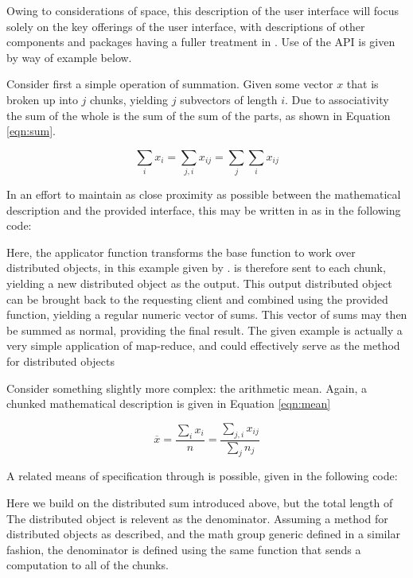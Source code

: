 Owing to considerations of space, this description of the user interface will focus solely on the key offerings of the  user interface, with descriptions of other components and packages having a fuller treatment in \cite{cairns2023}.
Use of the API is given by way of example below.

Consider first a simple operation of summation.
Given some vector $x$ that is broken up into $j$ chunks, yielding $j$ subvectors of length $i$.
Due to associativity the sum of the whole is the sum of the sum of the parts, as shown in Equation \ref{eqn:sum}.

\begin{equation}\label{eqn:sum}
    \sum_i x_i= \sum_{j,i}x_{ij} = \sum_j\sum_i x_{ij}
\end{equation}

In an effort to maintain as close proximity as possible between the mathematical description and the provided interface, this may be written in  as in the following  code:


Here, the  applicator function transforms the base  function to work over distributed objects, in this example given by .
 is therefore sent to each chunk, yielding a new distributed object as the output.
This output distributed object can be brought back to the requesting client and combined using the provided  function, yielding a regular  numeric vector of sums.
This vector of sums may then be summed as normal, providing the final result.
The given example is actually a very simple application of map-reduce, and could effectively serve as the  method for distributed objects

Consider something slightly more complex: the arithmetic mean.
Again, a chunked mathematical description is given in Equation \ref{eqn:mean}

\begin{equation}\label{eqn:mean}
    \overline{x} = \frac{\sum_{i}x_{i}}{n} = \frac{\sum_{j,i}x_{ij}}{\sum_j n_j}
\end{equation}

A related means of specification through  is possible, given in the following code:


Here we build on the distributed sum introduced above, but the total length of The distributed object is relevent as the denominator.
Assuming a  method for distributed objects as described, and the math group generic defined in a similar fashion, the denominator is defined using the same  function that sends a  computation to all of the chunks.

